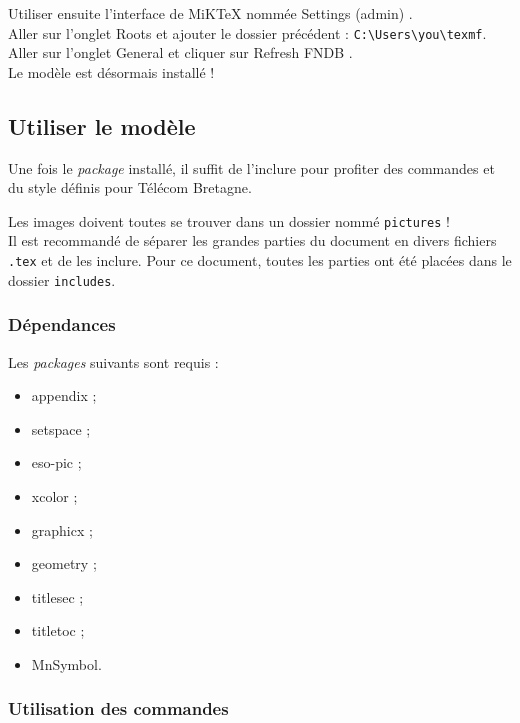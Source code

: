 \noindent Utiliser ensuite l'interface de MiK\TeX{} nommée \og Settings (admin) \fg.\\
Aller sur l'onglet \og Roots \fg{} et ajouter le dossier précédent : \texttt{C:\textbackslash Users\textbackslash you\textbackslash texmf}.\\
Aller sur l'onglet \og General \fg{} et cliquer sur \og Refresh FNDB \fg.\\

Le modèle est désormais installé !

\subsection{Utiliser le modèle}

Une fois le \textit{package} installé, il suffit de l'inclure pour profiter des commandes et du style définis pour Télécom Bretagne.
\begin{latex}
\usepackage{telecom}
\end{latex}

Les images doivent toutes se trouver dans un dossier nommé \texttt{pictures} ! \\
Il est recommandé de séparer les grandes parties du document en divers fichiers \texttt{.tex} et de les inclure. Pour ce document, toutes les parties ont été placées dans le dossier \texttt{includes}.

\subsubsection{Dépendances}

Les \textit{packages} suivants sont requis :
\begin{itemize}
\item appendix ;
\item setspace ;
\item eso-pic ;
\item xcolor ; 
\item graphicx ;
\item geometry ; 
\item titlesec ;
\item titletoc ;
\item MnSymbol.
\end{itemize}

\subsubsection{Utilisation des commandes}

